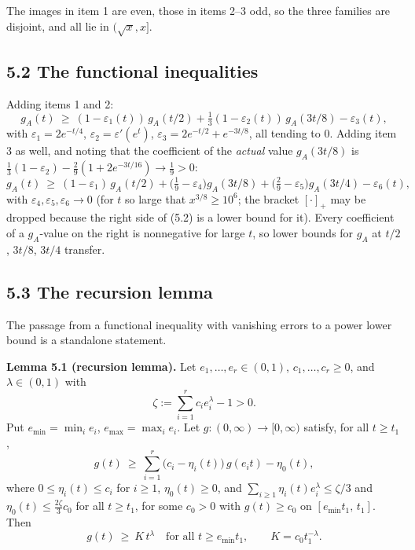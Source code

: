 \documentclass[11pt,a4paper]{article}
\begin{document}
The images in item 1 are even, those in items 2--3 odd, so the three
families are disjoint, and all lie in \((\sqrt x,x]\).

\subsection{5.2 The functional
inequalities}\label{the-functional-inequalities}

Adding items 1 and 2: \[
g_A(t)\ \ge\ (1-\varepsilon_1(t))\,g_A(t/2)+\tfrac13(1-\varepsilon_2(t))\,g_A(3t/8)-\varepsilon_3(t),
\tag{5.1}
\] with \(\varepsilon_1=2e^{-t/4}\),
\(\varepsilon_2=\varepsilon'(e^t)\),
\(\varepsilon_3=2e^{-t/2}+e^{-3t/8}\), all tending to \(0\). Adding item
3 as well, and noting that the coefficient of the \emph{actual} value
\(g_A(3t/8)\) is
\(\tfrac13(1-\varepsilon_2)-\tfrac2{9}(1+2e^{-3t/16})\to\tfrac19>0\): \[
g_A(t)\ \ge\ (1-\varepsilon_1)\,g_A(t/2)+\bigl(\tfrac19-\varepsilon_4\bigr)g_A(3t/8)+\bigl(\tfrac29-\varepsilon_5\bigr)g_A(3t/4)-\varepsilon_6(t),
\tag{5.2}
\] with \(\varepsilon_4,\varepsilon_5,\varepsilon_6\to 0\) (for \(t\) so
large that \(x^{3/8}\ge 10^6\); the bracket \([\cdot]_+\) may be dropped
because the right side of (5.2) is a lower bound for it). Every
coefficient of a \(g_A\)-value on the right is nonnegative for large
\(t\), so lower bounds for \(g_A\) at \(t/2\), \(3t/8\), \(3t/4\)
transfer.

\subsection{5.3 The recursion lemma}\label{the-recursion-lemma}

The passage from a functional inequality with vanishing errors to a
power lower bound is a standalone statement.

\textbf{Lemma 5.1 (recursion lemma).} Let \(e_1,\dots,e_r\in(0,1)\),
\(c_1,\dots,c_r\ge 0\), and \(\lambda\in(0,1)\) with \[
\zeta:=\sum_{i=1}^rc_ie_i^{\lambda}-1>0 .
\] Put \(e_{\min}=\min_ie_i\), \(e_{\max}=\max_ie_i\). Let
\(g:(0,\infty)\to[0,\infty)\) satisfy, for all \(t\ge t_1\), \[
g(t)\ \ge\ \sum_{i=1}^r\bigl(c_i-\eta_i(t)\bigr)\,g(e_it)-\eta_0(t),
\] where \(0\le\eta_i(t)\le c_i\) for \(i\ge 1\), \(\eta_0(t)\ge 0\),
and \(\sum_{i\ge1}\eta_i(t)e_i^\lambda\le\zeta/3\) and
\(\eta_0(t)\le\tfrac{2\zeta}3c_0\) for all \(t\ge t_1\), for some
\(c_0>0\) with \(g(t)\ge c_0\) on \([e_{\min}t_1,\,t_1]\). Then \[
g(t)\ \ge\ K\,t^{\lambda}\quad\text{for all }t\ge e_{\min}t_1,\qquad K=c_0t_1^{-\lambda}.
\]
\end{document}
